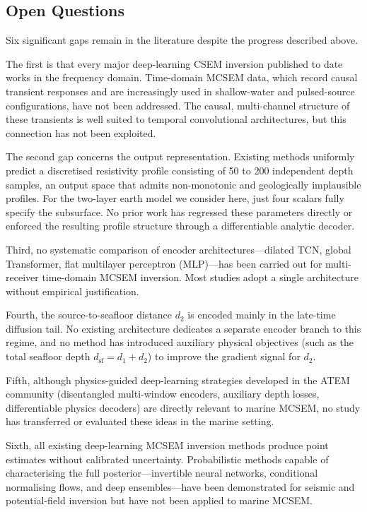 \documentclass[journal]{IEEEtran}
\begin{document}
\subsection{Open Questions}
\label{sec:gaps}

Six significant gaps remain in the literature despite the progress
described above.

The first is that every major deep-learning CSEM inversion published
to date works in the frequency domain. Time-domain MCSEM data, which
record causal transient responses and are increasingly used in
shallow-water and pulsed-source configurations, have not been
addressed. The causal, multi-channel structure of these transients is
well suited to temporal convolutional architectures, but this
connection has not been exploited.

The second gap concerns the output representation. Existing methods
uniformly predict a discretised resistivity profile consisting of 50
to 200 independent depth samples, an output space that admits
non-monotonic and geologically implausible profiles. For the
two-layer earth model we consider here, just four scalars fully
specify the subsurface. No prior work has regressed these parameters
directly or enforced the resulting profile structure through a
differentiable analytic decoder.

Third, no systematic comparison of encoder architectures---dilated
TCN, global Transformer, flat multilayer perceptron (MLP)---has been carried out for
multi-receiver time-domain MCSEM inversion. Most studies adopt a
single architecture without empirical justification.

Fourth, the source-to-seafloor distance $d_2$ is encoded mainly in
the late-time diffusion tail. No existing architecture dedicates a
separate encoder branch to this regime, and no method has introduced
auxiliary physical objectives (such as the total seafloor depth
$d_\mathrm{sf} = d_1 + d_2$) to improve the gradient signal for
$d_2$.

Fifth, although physics-guided deep-learning strategies developed
in the ATEM community (disentangled multi-window encoders, auxiliary
depth losses, differentiable physics decoders) are directly relevant
to marine MCSEM, no study has transferred or evaluated these ideas in
the marine setting.

Sixth, all existing deep-learning MCSEM inversion methods produce
point estimates without calibrated uncertainty.  Probabilistic methods
capable of characterising the full posterior---invertible neural
networks, conditional normalising flows, and deep ensembles---have
been demonstrated for seismic and potential-field inversion
but have not been applied to marine MCSEM.
\end{document}
